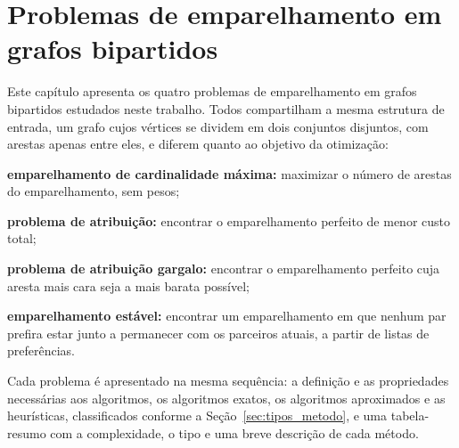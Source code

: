 

\chapter{Problemas de emparelhamento em grafos bipartidos}
\label{cap:bipartidos}

Este capítulo apresenta os quatro problemas de emparelhamento em grafos bipartidos estudados neste trabalho. Todos compartilham a mesma estrutura de entrada, um grafo cujos vértices se dividem em dois conjuntos disjuntos, com arestas apenas entre eles, e diferem quanto ao objetivo da otimização:

\begin{alineas}
    \item \textbf{emparelhamento de cardinalidade máxima:} maximizar o número de arestas do emparelhamento, sem pesos;
    \item \textbf{problema de atribuição:} encontrar o emparelhamento perfeito de menor custo total;
    \item \textbf{problema de atribuição gargalo:} encontrar o emparelhamento perfeito cuja aresta mais cara seja a mais barata possível;
    \item \textbf{emparelhamento estável:} encontrar um emparelhamento em que nenhum par prefira estar junto a permanecer com os parceiros atuais, a partir de listas de preferências.
\end{alineas}

Cada problema é apresentado na mesma sequência: a definição e as propriedades necessárias aos algoritmos, os algoritmos exatos, os algoritmos aproximados e as heurísticas, classificados conforme a Seção~\ref{sec:tipos_metodo}, e uma tabela-resumo com a complexidade, o tipo e uma breve descrição de cada método.





